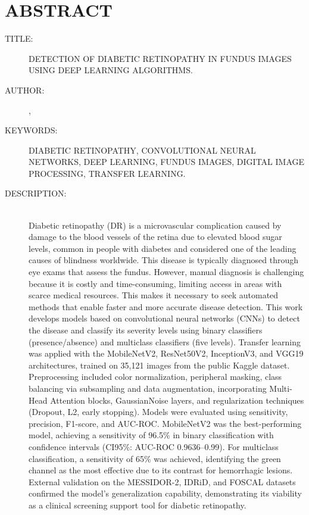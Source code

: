 
\chapter*{ABSTRACT}

\footnotesize{
\begin{description}
  \item[TITLE:] \MakeUppercase{Detection of Diabetic Retinopathy in Fundus Images Using
  Deep Learning Algorithms.}
  \item[AUTHOR:] {\autora}, {\autorb}
  \item[KEYWORDS:] DIABETIC RETINOPATHY, CONVOLUTIONAL NEURAL NETWORKS, DEEP LEARNING,
  FUNDUS IMAGES, DIGITAL IMAGE PROCESSING, TRANSFER LEARNING.
  \item[DESCRIPTION:]\hfill \\ Diabetic retinopathy (DR) is a microvascular complication
  caused by damage to the blood vessels of the retina due to elevated blood sugar levels,
  common in people with diabetes and considered one of the leading causes of blindness
  worldwide. This disease is typically diagnosed through eye exams that assess the fundus.
  However, manual diagnosis is challenging because it is costly and time-consuming,
  limiting access in areas with scarce medical resources. This makes it necessary to
  seek automated methods that enable faster and more accurate disease detection. This
  work develops models based on convolutional neural networks (CNNs) to detect the
  disease and classify its severity levels using binary classifiers (presence/absence)
  and multiclass classifiers (five levels). Transfer learning was applied with the
  MobileNetV2, ResNet50V2, InceptionV3, and VGG19 architectures, trained on 35,121
  images from the public Kaggle dataset. Preprocessing included color normalization,
  peripheral masking, class balancing via subsampling and data augmentation,
  incorporating Multi-Head Attention blocks, GaussianNoise layers, and regularization
  techniques (Dropout, L2, early stopping). Models were evaluated using sensitivity,
  precision, F1-score, and AUC-ROC. MobileNetV2 was the best-performing model,
  achieving a sensitivity of 96.5\% in binary classification with confidence intervals
  (CI95\%: AUC-ROC 0.9636--0.99). For multiclass classification, a sensitivity of 65\%
  was achieved, identifying the green channel as the most effective due to its contrast
  for hemorrhagic lesions. External validation on the MESSIDOR-2, IDRiD, and FOSCAL
  datasets confirmed the model's generalization capability, demonstrating its viability
  as a clinical screening support tool for diabetic retinopathy.

\end{description}}\normalsize
